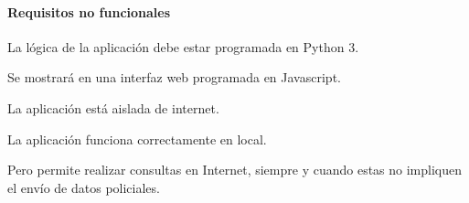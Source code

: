   \paragraph{Requisitos no funcionales}
  
  \begin{nonfunctional}
    \item La lógica de la aplicación debe estar programada en Python 3.
    \item Se mostrará en una interfaz web programada en Javascript.
    
    \item La aplicación está aislada de internet.
    \begin{nonfunctional}
      \item La aplicación funciona correctamente en local.
      \item Pero permite realizar consultas en Internet, siempre y cuando estas no impliquen el envío de datos policiales.
    \end{nonfunctional}
  \end{nonfunctional}